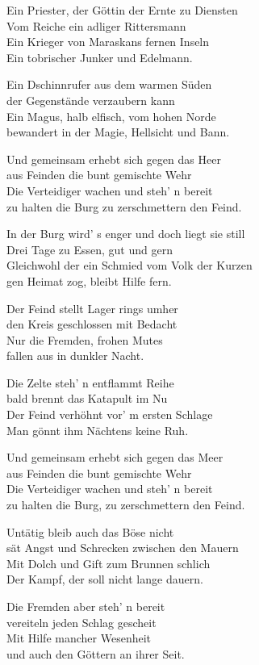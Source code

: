 Ein Priester, der Göttin der Ernte zu Diensten\\
Vom Reiche ein adliger Rittersmann\\
Ein Krieger von Maraskans fernen Inseln\\
Ein tobrischer Junker und Edelmann.

Ein Dschinnrufer aus dem warmen Süden\\
der Gegenstände verzaubern kann\\
Ein Magus, halb elfisch, vom hohen Norde\\
bewandert in der Magie, Hellsicht und Bann.

Und gemeinsam erhebt sich gegen das Heer\\
aus Feinden die bunt gemischte Wehr\\
Die Verteidiger wachen und steh' n bereit\\
zu halten die Burg zu zerschmettern den Feind.

In der Burg wird' s enger und doch liegt sie still\\
Drei Tage zu Essen, gut und gern\\
Gleichwohl der ein Schmied vom Volk der Kurzen\\
gen Heimat zog, bleibt Hilfe fern.

Der Feind stellt Lager rings umher\\
den Kreis geschlossen mit Bedacht\\
Nur die Fremden, frohen Mutes\\
fallen aus in dunkler Nacht.

Die Zelte steh' n entflammt Reihe\\
bald brennt das Katapult im Nu\\
Der Feind verhöhnt vor' m ersten Schlage\\
Man gönnt ihm Nächtens keine Ruh.

Und gemeinsam erhebt sich gegen das Meer\\
aus Feinden die bunt gemischte Wehr\\
Die Verteidiger wachen und steh' n bereit\\
zu halten die Burg, zu zerschmettern den Feind.

Untätig bleib auch das Böse nicht\\
sät Angst und Schrecken zwischen den Mauern\\
Mit Dolch und Gift zum Brunnen schlich\\
Der Kampf, der soll nicht lange dauern.

Die Fremden aber steh' n bereit\\
vereiteln jeden Schlag gescheit\\
Mit Hilfe mancher Wesenheit\\
und auch den Göttern an ihrer Seit.

